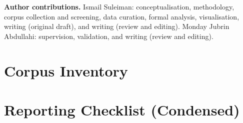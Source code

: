 \documentclass[sn-basic,pdflatex]{sn-jnl}
\begin{document}
\medskip\noindent\textbf{Author contributions.} Ismail Suleiman: conceptualisation, methodology, corpus collection and screening, data curation, formal analysis, visualisation, writing (original draft), and writing (review and editing). Monday Jubrin Abdullahi: supervision, validation, and writing (review and editing).



\appendix
\section{Corpus Inventory}\label{app:inventory}


\section{Reporting Checklist (Condensed)}\label{app:checklist}
\end{document}
